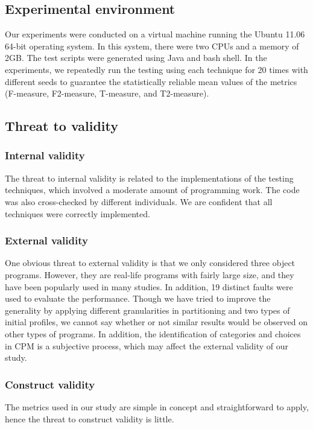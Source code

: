 \documentclass[10pt,journal,compsoc]{IEEEtran}
\begin{document}
\subsection{Experimental environment}

Our experiments were conducted on a virtual machine running the Ubuntu 11.06 64-bit operating system. In this system, there were two CPUs and a memory of 2GB. The test scripts were generated using Java and bash shell. In the experiments, we repeatedly run the testing using each technique for 20 times with different seeds to guarantee the statistically reliable mean values of the metrics (F-measure, F2-measure, T-measure, and T2-measure).


\subsection{Threat to validity}

\subsubsection{Internal validity}
The threat to internal validity is related to the implementations of the testing techniques, which involved a moderate amount of programming work. The code was also cross-checked by different individuals. We are confident that all techniques were correctly implemented.

\subsubsection{External validity}
One obvious threat to external validity is that we only considered three object programs. However, they are real-life programs with fairly large size, and they have been popularly used in many studies. In addition, 19 distinct faults were used to evaluate the performance. Though we have tried to improve the generality by applying different granularities in partitioning and two types of initial profiles, we cannot say whether or not similar results would be observed on other types of programs. In addition, the identification of categories and choices in CPM is a subjective process, which may affect the external validity of our study.

\subsubsection{Construct validity}
The metrics used in our study are simple in concept and straightforward to apply, hence the threat to construct validity is little.
\end{document}
